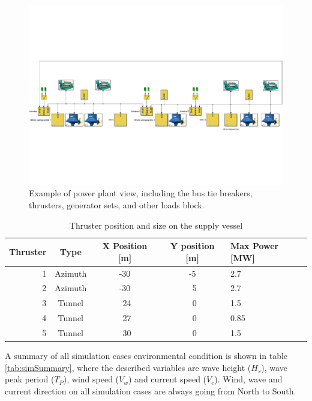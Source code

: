 \documentclass[journal]{IEEEtran}
\newcommand\T{\rule{0pt}{2.6ex}}       %
\newcommand\B{\rule[-1.2ex]{0pt}{0pt}} %
\begin{document}
\begin{figure}[t!]
\centering
\includegraphics[trim= 0 180 0 180,width=\textwidth,clip]{./figures/supply.pdf}
\caption{Example of power plant view, including the bus tie breakers, thrusters, generator sets, and other loads block. }
\label{fig:supply}
\end{figure}

\begin{table}[!htb]
	\caption{Thruster position and size on the supply vessel}	
	\label{tab:thrusterPositionSupply}
	\begin{center}
	\begin{tabularx}{\columnwidth}{ rcccY } \hline\T
		Thruster& Type & X Position [m] & Y position [m] & Max Power [MW] \B\\
		\hline			\T
		1 & Azimuth & -30 & -5	& 2.7\\
		2 & Azimuth & -30 &  ~5	& 2.7\\
		3 & Tunnel 	& ~24 &  ~0	& 1.5\\
		4 & Tunnel 	& ~27 &  ~0	& 0.85\\
		5 & Tunnel 	& ~30 &  ~0	& 1.5 \B\\ \hline
	\end{tabularx}
	\end{center}
\end{table}


A summary of all simulation cases environmental condition is shown in table \ref{tab:simSummary}, where the described variables are wave height ($H_s$), wave peak period ($T_P$), wind speed ($V_w$) and current speed ($V_c$). Wind, wave and current direction on all simulation cases are always going from North to South.
\end{document}
